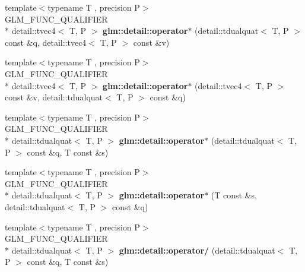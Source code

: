 \begin{DoxyCompactItemize}
\item 
\hypertarget{namespaceglm_1_1detail_a977e73a0991cf9747d291055281bba99}{{\footnotesize template$<$typename T , precision P$>$ }\\G\-L\-M\-\_\-\-F\-U\-N\-C\-\_\-\-Q\-U\-A\-L\-I\-F\-I\-E\-R \\*
detail\-::tvec4$<$ T, P $>$ {\bfseries glm\-::detail\-::operator$\ast$} (detail\-::tdualquat$<$ T, P $>$ const \&q, detail\-::tvec4$<$ T, P $>$ const \&v)}\label{namespaceglm_1_1detail_a977e73a0991cf9747d291055281bba99}

\item 
\hypertarget{namespaceglm_1_1detail_a68f661e14500498fba71d86fb337663a}{{\footnotesize template$<$typename T , precision P$>$ }\\G\-L\-M\-\_\-\-F\-U\-N\-C\-\_\-\-Q\-U\-A\-L\-I\-F\-I\-E\-R \\*
detail\-::tvec4$<$ T, P $>$ {\bfseries glm\-::detail\-::operator$\ast$} (detail\-::tvec4$<$ T, P $>$ const \&v, detail\-::tdualquat$<$ T, P $>$ const \&q)}\label{namespaceglm_1_1detail_a68f661e14500498fba71d86fb337663a}

\item 
\hypertarget{namespaceglm_1_1detail_a965b953d4689372dd4df294473cea0fd}{{\footnotesize template$<$typename T , precision P$>$ }\\G\-L\-M\-\_\-\-F\-U\-N\-C\-\_\-\-Q\-U\-A\-L\-I\-F\-I\-E\-R \\*
detail\-::tdualquat$<$ T, P $>$ {\bfseries glm\-::detail\-::operator$\ast$} (detail\-::tdualquat$<$ T, P $>$ const \&q, T const \&s)}\label{namespaceglm_1_1detail_a965b953d4689372dd4df294473cea0fd}

\item 
\hypertarget{namespaceglm_1_1detail_a7b88b1a7895198efe97e920a607de590}{{\footnotesize template$<$typename T , precision P$>$ }\\G\-L\-M\-\_\-\-F\-U\-N\-C\-\_\-\-Q\-U\-A\-L\-I\-F\-I\-E\-R \\*
detail\-::tdualquat$<$ T, P $>$ {\bfseries glm\-::detail\-::operator$\ast$} (T const \&s, detail\-::tdualquat$<$ T, P $>$ const \&q)}\label{namespaceglm_1_1detail_a7b88b1a7895198efe97e920a607de590}

\item 
\hypertarget{namespaceglm_1_1detail_a6fcb533c98cff35eddd2b5867e9f3acf}{{\footnotesize template$<$typename T , precision P$>$ }\\G\-L\-M\-\_\-\-F\-U\-N\-C\-\_\-\-Q\-U\-A\-L\-I\-F\-I\-E\-R \\*
detail\-::tdualquat$<$ T, P $>$ {\bfseries glm\-::detail\-::operator/} (detail\-::tdualquat$<$ T, P $>$ const \&q, T const \&s)}\label{namespaceglm_1_1detail_a6fcb533c98cff35eddd2b5867e9f3acf}


\end{DoxyCompactItemize}
